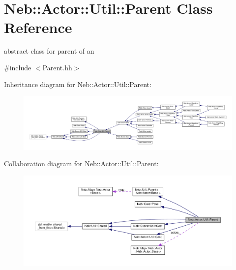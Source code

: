 \hypertarget{classNeb_1_1Actor_1_1Util_1_1Parent}{\section{Neb\-:\-:Actor\-:\-:Util\-:\-:Parent Class Reference}
\label{classNeb_1_1Actor_1_1Util_1_1Parent}
}


abstract class for parent of an   




{\ttfamily \#include $<$Parent.\-hh$>$}



Inheritance diagram for Neb\-:\-:Actor\-:\-:Util\-:\-:Parent\-:
\nopagebreak
\begin{figure}[H]
\begin{center}
\leavevmode
\includegraphics[width=350pt]{classNeb_1_1Actor_1_1Util_1_1Parent__inherit__graph}
\end{center}
\end{figure}


Collaboration diagram for Neb\-:\-:Actor\-:\-:Util\-:\-:Parent\-:
\nopagebreak
\begin{figure}[H]
\begin{center}
\leavevmode
\includegraphics[width=350pt]{classNeb_1_1Actor_1_1Util_1_1Parent__coll__graph}
\end{center}
\end{figure}
